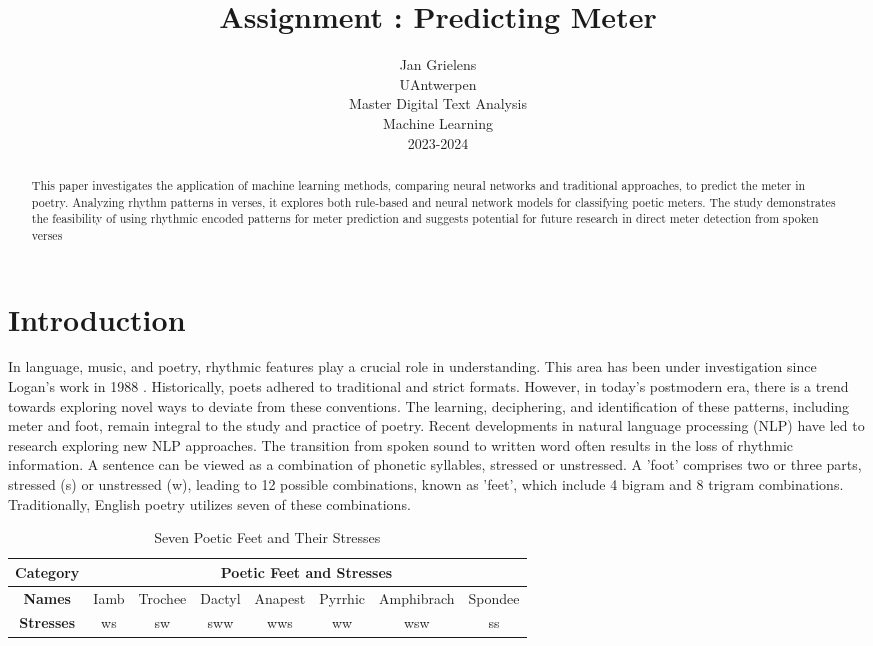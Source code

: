 \documentclass{article}
\title{Assignment : Predicting Meter
}
\author{
  Jan Grielens \\
  UAntwerpen \\
  Master Digital Text Analysis\\
  Machine Learning\\
  2023-2024 \\
}
\begin{document}
\maketitle


\begin{abstract}
This paper investigates the application of machine learning methods, comparing neural networks and traditional approaches, to predict the meter in poetry. Analyzing rhythm patterns in verses, it explores both rule-based and neural network models for classifying poetic meters. The study demonstrates the feasibility of using rhythmic encoded patterns for meter prediction and suggests potential for future research in direct meter detection from spoken verses
\end{abstract}





\section{Introduction}

In language, music, and poetry, rhythmic features play a crucial role in understanding. This area has been under investigation since Logan's work in 1988 \cite{LoganRythm}. Historically, poets adhered to traditional and strict formats. However, in today's postmodern era, there is a trend towards exploring novel ways to deviate from these conventions. The learning, deciphering, and identification of these patterns, including meter and foot, remain integral to the study and practice of poetry.
Recent developments in natural language processing (NLP) have led to research exploring new NLP approaches. The transition from spoken sound to written word often results in the loss of rhythmic information. A sentence can be viewed as a combination of phonetic syllables, stressed or unstressed. A 'foot' comprises two or three parts, stressed (s) or unstressed (w), leading to 12 possible combinations, known as 'feet', which include 4 bigram and 8 trigram combinations. Traditionally, English poetry utilizes seven of these combinations.
\begin{table}[h!]
    \centering
    \caption{Seven Poetic Feet and Their Stresses}
    \label{tab:poetic_feet_stresses}
    \begin{tabular}{|c|c|c|c|c|c|c|c|}
    \hline
    \textbf{Category} & \multicolumn{7}{c|}{Poetic Feet and Stresses} \\ \hline
    \textbf{Names}    & Iamb & Trochee & Dactyl & Anapest & Pyrrhic & Amphibrach & Spondee \\ \hline
    \textbf{Stresses} & ws   & sw     & sww    & wws     & ww      & wsw        & ss      \\ \hline
    \end{tabular} 
\end{table}
\end{document}
